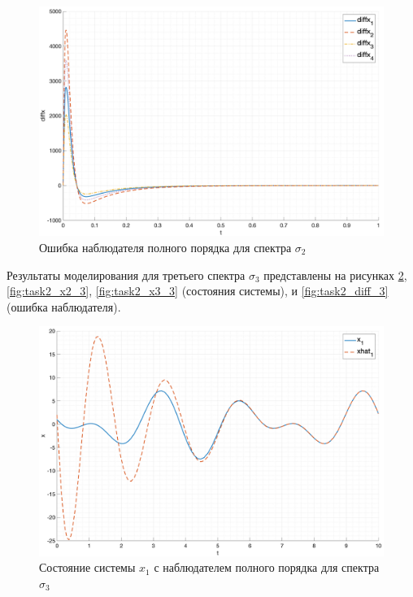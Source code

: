 \begin{figure}[ht!]
    \centering
    \includegraphics[width=\textwidth]{media/plots/task2_diffx_2.png}
    \caption{Ошибка наблюдателя полного порядка для спектра $\sigma_2$}
    \label{fig:task2_diff_2}
\end{figure}

Результаты моделирования для третьего спектра $\sigma_3$ представлены на рисунках \ref{fig:task2_x1_3}, \ref{fig:task2_x2_3}, \ref{fig:task2_x3_3} (состояния системы), и \ref{fig:task2_diff_3} (ошибка наблюдателя).
\begin{figure}[ht!]
    \centering
    \includegraphics[width=\textwidth]{media/plots/task2_x1_3.png}
    \caption{Состояние системы $x_1$ с наблюдателем полного порядка для спектра $\sigma_3$}
    \label{fig:task2_x1_3}
\end{figure}

